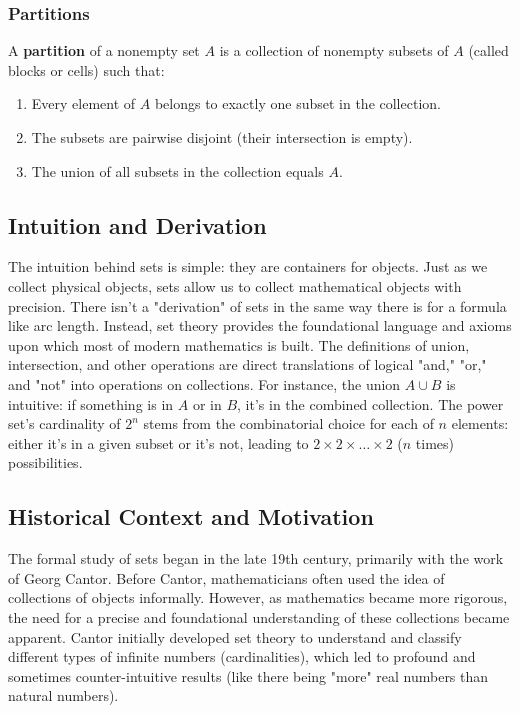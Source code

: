 \documentclass{article}
\begin{document}
\subsubsection{Partitions}
A \textbf{partition} of a nonempty set $A$ is a collection of nonempty subsets of $A$ (called blocks or cells) such that:
\begin{enumerate}
    \item Every element of $A$ belongs to exactly one subset in the collection.
    \item The subsets are pairwise disjoint (their intersection is empty).
    \item The union of all subsets in the collection equals $A$.
\end{enumerate}

\subsection{Intuition and Derivation}
The intuition behind sets is simple: they are containers for objects. Just as we collect physical objects, sets allow us to collect mathematical objects with precision. There isn't a "derivation" of sets in the same way there is for a formula like arc length. Instead, set theory provides the foundational language and axioms upon which most of modern mathematics is built. The definitions of union, intersection, and other operations are direct translations of logical "and," "or," and "not" into operations on collections. For instance, the union $A \cup B$ is intuitive: if something is in $A$ or in $B$, it's in the combined collection. The power set's cardinality of $2^n$ stems from the combinatorial choice for each of $n$ elements: either it's in a given subset or it's not, leading to $2 \times 2 \times \dots \times 2$ ($n$ times) possibilities.

\subsection{Historical Context and Motivation}
The formal study of sets began in the late 19th century, primarily with the work of Georg Cantor. Before Cantor, mathematicians often used the idea of collections of objects informally. However, as mathematics became more rigorous, the need for a precise and foundational understanding of these collections became apparent. Cantor initially developed set theory to understand and classify different types of infinite numbers (cardinalities), which led to profound and sometimes counter-intuitive results (like there being "more" real numbers than natural numbers).
\end{document}
